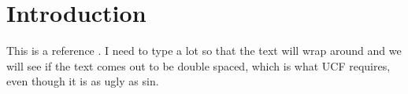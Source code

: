 
\chapter{Introduction}

This is a reference \cite{AndradeHlady1986}. I need to type a lot
so that the text will wrap around and we will see if the text comes
out to be double spaced, which is what UCF requires, even though it
is as ugly as sin.
